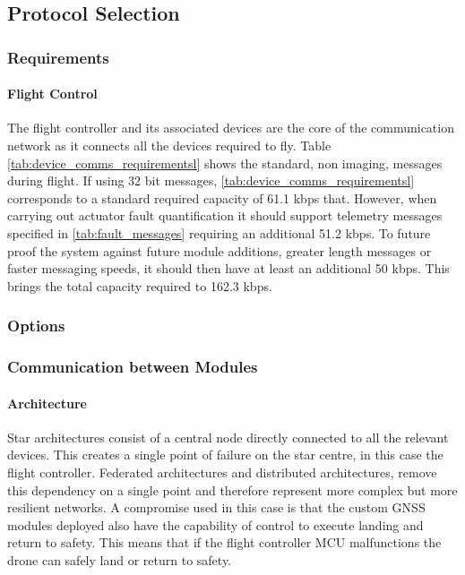 \subsection{Protocol Selection}

\subsubsection{Requirements}
\paragraph{Flight Control}

The flight controller and its associated devices are the core of the communication network as it connects all the devices required to fly. Table \ref{tab:device_comms_requirementsl} shows the standard, non imaging, messages during flight. If using 32 bit messages, \ref{tab:device_comms_requirementsl} corresponds to a standard required capacity of 61.1 kbps that. However, when carrying out actuator fault quantification it should support telemetry messages specified in \ref{tab:fault_messages} requiring an additional 51.2 kbps. To future proof the system against future module additions, greater length messages or faster messaging speeds, it should then have at least an additional 50 kbps. This brings the total capacity required to 162.3 kbps.
\subsubsection{Options}


\subsubsection{Communication between Modules}
\paragraph{Architecture}
Star architectures consist of a central node directly connected to all the relevant devices. This creates a single point of failure on the star centre, in this case the flight controller. Federated architectures and distributed architectures, remove this dependency on a single point and therefore represent more complex but more resilient networks. A compromise used in this case is that the custom \gls{GNSS} modules deployed also have the capability of control to execute landing and return to safety. This means that if the flight controller \gls{MCU} malfunctions the drone can safely land or return to safety.  
